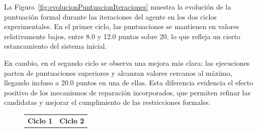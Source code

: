 \documentclass[12pt,a4paper,twoside,openright]{book}
\begin{document}
La Figura~\ref{fig:evolucionPuntuacionIteraciones} muestra la evolución de la puntuación formal durante las iteraciones del agente en los dos ciclos experimentales. En el primer ciclo, las puntuaciones se mantienen en valores relativamente bajos, entre 8.0 y 12.0 puntos sobre 20, lo que refleja un cierto estancamiento del sistema inicial.

En cambio, en el segundo ciclo se observa una mejora más clara: las ejecuciones parten de puntuaciones superiores y alcanzan valores cercanos al máximo, llegando incluso a 20.0 puntos en una de ellas. Esta diferencia evidencia el efecto positivo de los mecanismos de reparación incorporados, que permiten refinar las candidatas y mejorar el cumplimiento de las restricciones formales.


\begin{figure}[h]
    \centering
    
    \vspace{0.25cm}
    
    \begin{tabular}{ll}
        \textbf{Ciclo 1} & \textbf{Ciclo 2} \\[0.1cm]
        

\end{tabular}
\end{figure}
\end{document}
